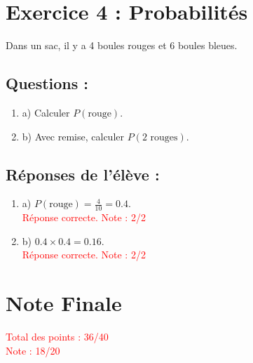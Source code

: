 \documentclass{article}
\begin{document}
\section*{Exercice 4 : Probabilités}

Dans un sac, il y a 4 boules rouges et 6 boules bleues. 

\subsection*{Questions :}
\begin{enumerate}
    \item a) Calculer $P(\text{rouge})$.
    \item b) Avec remise, calculer $P(2 \text{ rouges})$.
\end{enumerate}

\subsection*{Réponses de l’élève :}
\begin{enumerate}
    \item a) $P(\text{rouge}) = \frac{4}{10} = 0.4$. \\
    \textcolor{red}{Réponse correcte. Note : 2/2}
    
    \item b) $0.4 \times 0.4 = 0.16$. \\
    \textcolor{red}{Réponse correcte. Note : 2/2}
\end{enumerate}

\section*{Note Finale}

\textcolor{red}{Total des points : 36/40 \\
Note : 18/20}
\end{document}
